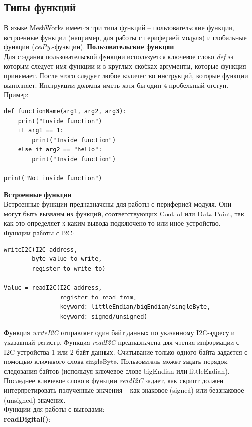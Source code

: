 \documentclass[12pt]{article}
\begin{document}
\subsection{Типы функций}
В языке MeshWorks имеется три типа функций -- пользовательские функции, встроенные 
функции (например, для работы с периферией модуля) и глобальные функции 
(\emph{celPy.}-функции).\newline
\textbf{Пользовательские функции}\\
Для создания пользовательской функции используется ключевое слово \emph{def} 
за которым следует имя функции и в круглых скобках аргументы, которые функция 
принимает. После этого следует любое количество инструкций, которые функции выполняет.
Инструкции должны иметь хотя бы один 4-пробельный отступ.
Пример:
\begin{verbatim}
def functionName(arg1, arg2, arg3):
    print("Inside function")
    if arg1 == 1:
        print("Inside function")
    else if arg2 == "hello":
        print("Inside function")

print("Not inside function")
\end{verbatim}
\textbf{Встроенные функции}\\
Встроенные функции предназначены для работы с периферией модуля. Они могут быть 
вызваны из функций, соответствующих Control или Data Point, так как это определяет
к каким вывода подключено то или иное устройство.\\
Функции работы с I2C:
\begin{verbatim}
writeI2C(I2C address,
        byte value to write,
        register to write to)

Value = readI2C(I2C address,
                register to read from,
                keyword: littleEndian/bigEndian/singleByte,
                keyword: signed/unsigned)
\end{verbatim}
Функция \emph{writeI2C} отправляет один байт данных по указанному I2C-адресу и 
указанный регистр. Функция \emph{readI2C} предназначена для чтения информации с 
I2C-устройства 1 или 2 байт данных. Считывание только одного байта задается с 
помощью ключевого слова singleByte. Пользователь может задать порядок следования 
байтов (используя ключевое слове bigEndian или littleEndian). Последнее ключевое 
слово в функции \emph{readI2C} задает, как скрипт должен интерпретировать полученные 
значения -- как знаковое (signed) или беззнаковое (unsigned) значение.\\
Функции для работы с выводами:\\
\textbf{readDigital()}:
\end{document}
